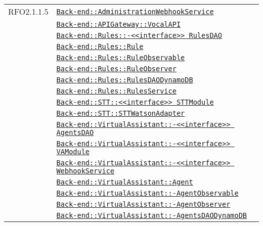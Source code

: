 \begin{longtable}{|>{\centering}m{3cm}|m{10cm}<{\centering}|}
RFO2.1.1.5 & \hyperref[Back-end::AdministrationWebhookService]{\texttt{Back-end::AdministrationWebhookService}}\\
& \hyperref[Back-end::APIGateway::VocalAPI]{\texttt{Back-end::APIGateway::VocalAPI}}\\
& \hyperref[Back-end::Rules::<<interface>> RulesDAO]{\texttt{Back-end::Rules::-\linebreak <<interface>> RulesDAO}}\\
& \hyperref[Back-end::Rules::Rule]{\texttt{Back-end::Rules::Rule}}\\
& \hyperref[Back-end::Rules::RuleObservable]{\texttt{Back-end::Rules::RuleObservable}}\\
& \hyperref[Back-end::Rules::RuleObserver]{\texttt{Back-end::Rules::RuleObserver}}\\
& \hyperref[Back-end::Rules::RulesDAODynamoDB]{\texttt{Back-end::Rules::RulesDAODynamoDB}}\\
& \hyperref[Back-end::Rules::RulesService]{\texttt{Back-end::Rules::RulesService}}\\
& \hyperref[Back-end::STT::<<interface>> STTModule]{\texttt{Back-end::STT::<<interface>> STTModule}}\\
& \hyperref[Back-end::STT::STTWatsonAdapter]{\texttt{Back-end::STT::STTWatsonAdapter}}\\
& \hyperref[Back-end::VirtualAssistant::<<interface>> AgentsDAO]{\texttt{Back-end::VirtualAssistant::-\linebreak <<interface>> AgentsDAO}}\\
& \hyperref[Back-end::VirtualAssistant::<<interface>> VAModule]{\texttt{Back-end::VirtualAssistant::-\linebreak <<interface>> VAModule}}\\
& \hyperref[Back-end::VirtualAssistant::<<interface>> WebhookService]{\texttt{Back-end::VirtualAssistant::-\linebreak <<interface>> WebhookService}}\\
& \hyperref[Back-end::VirtualAssistant::Agent]{\texttt{Back-end::VirtualAssistant::Agent}}\\
& \hyperref[Back-end::VirtualAssistant::AgentObservable]{\texttt{Back-end::VirtualAssistant::-\linebreak AgentObservable}}\\
& \hyperref[Back-end::VirtualAssistant::AgentObserver]{\texttt{Back-end::VirtualAssistant::-\linebreak AgentObserver}}\\
& \hyperref[Back-end::VirtualAssistant::AgentsDAODynamoDB]{\texttt{Back-end::VirtualAssistant::-\linebreak AgentsDAODynamoDB}}\\

\end{longtable}
